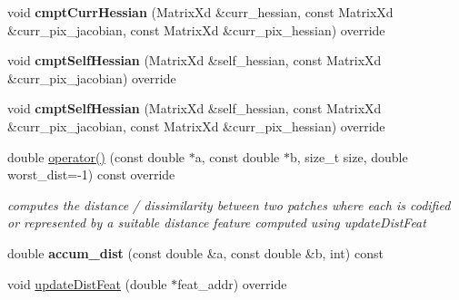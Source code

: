 \begin{DoxyCompactItemize}
\item 
\hypertarget{classNCC_a54eee6865bba31f6e6d1b6058b3baa0c}{void {\bfseries cmpt\-Curr\-Hessian} (Matrix\-Xd \&curr\-\_\-hessian, const Matrix\-Xd \&curr\-\_\-pix\-\_\-jacobian, const Matrix\-Xd \&curr\-\_\-pix\-\_\-hessian) override}\label{classNCC_a54eee6865bba31f6e6d1b6058b3baa0c}

\item 
\hypertarget{classNCC_ac6065021092e29434ed2b336680e5804}{void {\bfseries cmpt\-Self\-Hessian} (Matrix\-Xd \&self\-\_\-hessian, const Matrix\-Xd \&curr\-\_\-pix\-\_\-jacobian) override}\label{classNCC_ac6065021092e29434ed2b336680e5804}

\item 
\hypertarget{classNCC_a43362304097f699c6e1f95f3e0db246f}{void {\bfseries cmpt\-Self\-Hessian} (Matrix\-Xd \&self\-\_\-hessian, const Matrix\-Xd \&curr\-\_\-pix\-\_\-jacobian, const Matrix\-Xd \&curr\-\_\-pix\-\_\-hessian) override}\label{classNCC_a43362304097f699c6e1f95f3e0db246f}

\item 
\hypertarget{classNCC_a9e60a179d6cdc8f26b099bb692486fa1}{double \hyperlink{classNCC_a9e60a179d6cdc8f26b099bb692486fa1}{operator()} (const double $\ast$a, const double $\ast$b, size\-\_\-t size, double worst\-\_\-dist=-\/1) const override}\label{classNCC_a9e60a179d6cdc8f26b099bb692486fa1}

\begin{DoxyCompactList}\small\item\em computes the distance / dissimilarity between two patches where each is codified or represented by a suitable distance feature computed using update\-Dist\-Feat \end{DoxyCompactList}\item 
\hypertarget{classNCC_abc2e32c66710061c93d55b194b15a7ab}{double {\bfseries accum\-\_\-dist} (const double \&a, const double \&b, int) const }\label{classNCC_abc2e32c66710061c93d55b194b15a7ab}

\item 
\hypertarget{classNCC_a6bd94c28687e27288c798fe79b683b23}{void \hyperlink{classNCC_a6bd94c28687e27288c798fe79b683b23}{update\-Dist\-Feat} (double $\ast$feat\-\_\-addr) override}\label{classNCC_a6bd94c28687e27288c798fe79b683b23}


\end{DoxyCompactItemize}
